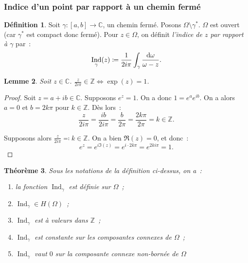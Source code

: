 \documentclass{report}
\newtheorem{thm}{Théorème}[chapter]
\newtheorem{lem}[thm]{Lemme}
\theoremstyle{definition}
\newtheorem{déf}[thm]{Définition}
\theoremstyle{remark}
\numberwithin{equation}{section}
\newcommand{\C}{\mathbb C}
\newcommand{\Z}{\mathbb Z}
\DeclareMathOperator{\Ind}{Ind}
\begin{document}
		\subsubsection{Indice d'un point par rapport à un chemin fermé}
			\begin{déf} Soit $\gamma : [a, b] \to \C$, un chemin fermé. Posons $\Omega \setminus \gamma^*$. $\Omega$ est ouvert (car $\gamma^*$ est compact donc fermé).
			Pour $z \in \Omega$, on définit \textit{l'indice de $z$ par rapport à $\gamma$} par~:
			\begin{equation}
				\Ind_\gamma(z) \coloneqq \frac 1{2i\pi}\int_\gamma \frac {\dif \omega}{\omega - z}.
			\end{equation}
			\end{déf}

			\begin{lem}\label{lem:e^z=1} Soit $z \in \C$. $\frac z{2i\pi} \in \Z \iff \exp(z) = 1$.
			\end{lem}

			\begin{proof} Soit $z = a + ib\in \C$. Supposons $e^z = 1$. On a donc $1 = e^ae^{ib}$. On a alors $a=0$ et $b=2k\pi$ pour $k \in \Z$. Dès lors~:
			\begin{equation}
				\frac z{2i\pi} = \frac {ib}{2i\pi} = \frac b{2\pi} = \frac {2k\pi}{2\pi} = k \in \Z.
			\end{equation}

			Supposons alors $\frac z{2i\pi} \eqqcolon k \in \Z$. On a bien $\Re(z) = 0$, et donc~:
			\begin{equation}
				e^z = e^{i\Im(z)} = e^{i \cdot 2k\pi} = e^{2ki\pi} = 1.
			\end{equation}
			\end{proof}

			\begin{thm} Sous les notations de la définition ci-dessus, on a~:
			\begin{enumerate}
				\item la fonction $\Ind_\gamma$ est définie sur $\Omega$~;  %
				\item $\Ind_\gamma \in H(\Omega)$~;
				\item $\Ind_\gamma$ est à valeurs dans $\Z$~;
				\item $\Ind_\gamma$ est constante sur les composantes connexes de $\Omega$~;
				\item $\Ind_\gamma$ vaut $0$ sur la composante connexe non-bornée de $\Omega$
			\end{enumerate}
			\end{thm}
\end{document}
